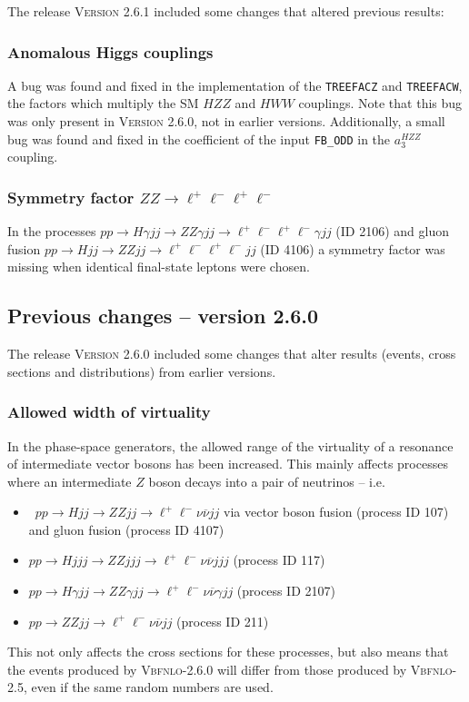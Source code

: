 \documentclass[english,12pt]{article}
\begin{document}
The release \textsc{Version 2.6.1} included some changes that altered previous results:

\subsubsection{Anomalous Higgs couplings}

A bug was found and fixed in the implementation of the {\tt TREEFACZ} and {\tt TREEFACW}, 
the factors which multiply the SM $HZZ$ and $HWW$ couplings.  Note that this bug was only 
present in \textsc{Version 2.6.0}, not in earlier versions.  Additionally, a small bug was 
found and fixed in the coefficient of the input {\tt FB\_ODD} in the $a_{3}^{HZZ}$ coupling.

\subsubsection{Symmetry factor $ZZ \rightarrow \ell^{+} \ell^{-} \ell^{+} \ell^{-}$ }

In the processes $pp \rightarrow H \gamma jj \rightarrow ZZ \gamma jj \rightarrow \ell^{+} 
\ell^{-} \ell^{+} \ell^{-} \gamma jj$ (ID 2106) and gluon fusion $pp \rightarrow H jj \rightarrow 
ZZ jj \rightarrow \ell^{+} \ell^{-} \ell^{+} \ell^{-} jj $ (ID 4106) a symmetry factor was missing 
when identical final-state leptons were chosen.


\subsection{Previous changes -- version 2.6.0}

The release \textsc{Version 2.6.0} included some changes 
that alter results (events, cross sections and distributions) from earlier versions.

\subsubsection{Allowed width of virtuality}
In the phase-space generators, the allowed range of the virtuality of a resonance of intermediate vector bosons has been increased.  This mainly affects processes where an intermediate $Z$ boson decays into a pair of neutrinos -- i.e.
\begin{itemize}
 \item \ $pp \rightarrow Hjj \rightarrow ZZjj \rightarrow \ell^{+} \ell^{-} \nu \overline{\nu} jj$ via vector boson fusion (process ID 107) and gluon fusion (process ID 4107)
 \item $pp \rightarrow Hjjj \rightarrow ZZjjj \rightarrow \ell^{+} \ell^{-} \nu \overline{\nu} jjj$ (process ID 117)
 \item $pp \rightarrow H\gamma jj \rightarrow ZZ\gamma jj \rightarrow \ell^{+} \ell^{-} \nu \overline{\nu} \gamma jj$ (process ID 2107)
 \item $pp \rightarrow ZZjj \rightarrow \ell^{+} \ell^{-} \nu \overline{\nu} jj$ (process ID 211)
\end{itemize}
This not only affects the cross sections for these processes, but also means that the events produced by \textsc{Vbfnlo-2.6.0} will differ from those produced by \textsc{Vbfnlo-2.5}, even if the same random numbers are used.
\end{document}
